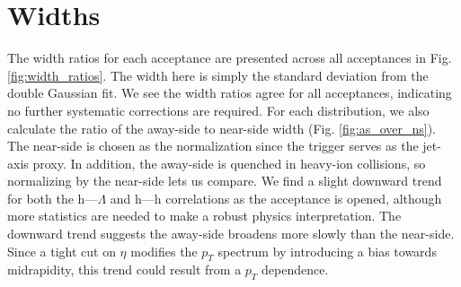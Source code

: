 \documentclass[../main.tex]{subfiles}
\begin{document}
\clearpage
\section{Widths}
The width ratios for each acceptance are presented across all acceptances in Fig. \ref{fig:width_ratios}. The width here is simply the standard deviation from the double Gaussian fit. We see the width ratios agree for all acceptances, indicating no further systematic corrections are required. For each distribution, we also calculate the ratio of the away-side to near-side width (Fig. \ref{fig:as_over_ns}). The near-side is chosen as the normalization since the trigger serves as the jet-axis proxy. In addition, the away-side is quenched in heavy-ion collisions, so normalizing by the near-side lets us compare. We find a slight downward trend for both the h---$\Lambda$ and h---h correlations as the acceptance is opened, although more statistics are needed to make a robust physics interpretation. The downward trend suggests the away-side broadens more slowly than the near-side. Since a tight cut on $\eta$ modifies the $p_T$ spectrum by introducing a bias towards midrapidity, this trend could result from a $p_T$ dependence. 
\end{document}
